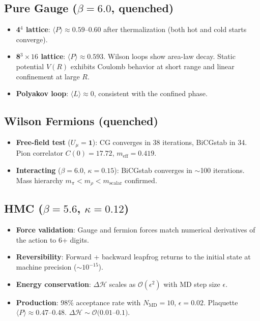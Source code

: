 \documentclass[12pt]{article}
\begin{document}
\subsection{Pure Gauge ($\beta = 6.0$, quenched)}

\begin{itemize}
\item \textbf{4$^4$ lattice}: $\langle P \rangle \approx 0.59$--$0.60$ after thermalization (both hot and cold starts converge).
\item \textbf{8$^3 \times 16$ lattice}: $\langle P \rangle \approx 0.593$. Wilson loops show area-law decay. Static potential $V(R)$ exhibits Coulomb behavior at short range and linear confinement at large $R$.
\item \textbf{Polyakov loop}: $\langle L \rangle \approx 0$, consistent with the confined phase.
\end{itemize}

\subsection{Wilson Fermions (quenched)}

\begin{itemize}
\item \textbf{Free-field test} ($U_\mu = \mathbf{1}$): CG converges in 38 iterations, BiCGstab in 34. Pion correlator $C(0) = 17.72$, $m_{\mathrm{eff}} = 0.419$.
\item \textbf{Interacting} ($\beta = 6.0$, $\kappa = 0.15$): BiCGstab converges in $\sim$100 iterations. Mass hierarchy $m_\pi < m_\rho < m_{\mathrm{scalar}}$ confirmed.
\end{itemize}

\subsection{HMC ($\beta = 5.6$, $\kappa = 0.12$)}

\begin{itemize}
\item \textbf{Force validation}: Gauge and fermion forces match numerical derivatives of the action to 6+ digits.
\item \textbf{Reversibility}: Forward + backward leapfrog returns to the initial state at machine precision ($\sim 10^{-15}$).
\item \textbf{Energy conservation}: $\Delta\mathcal{H}$ scales as $\mathcal{O}(\epsilon^2)$ with MD step size $\epsilon$.
\item \textbf{Production}: 98\% acceptance rate with $N_{\mathrm{MD}} = 10$, $\epsilon = 0.02$. Plaquette $\langle P \rangle \approx 0.47$--$0.48$. $\Delta\mathcal{H} \sim \mathcal{O}(0.01$--$0.1)$.
\end{itemize}
\end{document}
